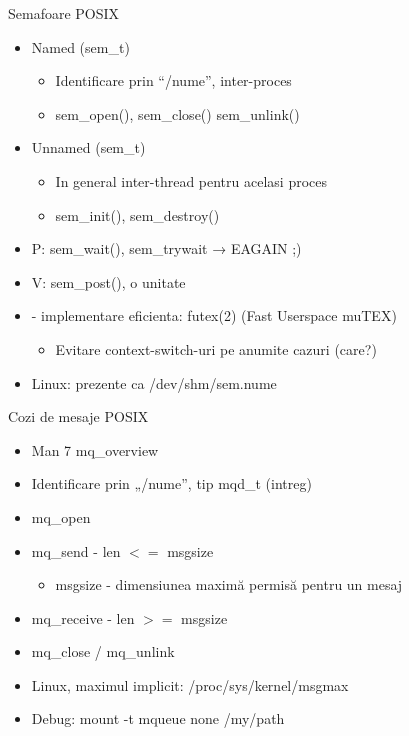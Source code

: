 \documentclass{so.cs.pub.ro}
\begin{document}
\begin{frame}{Semafoare POSIX}
  \begin{itemize}
		\item Named (sem_t)
  			\begin{itemize}
			 \item Identificare prin “/nume”, inter-proces
			 \item sem_open(), sem_close() sem_unlink()
		  \end{itemize}
		\item Unnamed (sem_t)
		  \begin{itemize}
			\item In general inter-thread pentru acelasi proces
			\item sem_init(), sem_destroy()
		  \end{itemize}
		\item P: sem_wait(), sem_trywait → EAGAIN ;)
		\item V: sem_post(), o unitate
		\item - implementare eficienta: futex(2) (Fast Userspace muTEX)
			\begin{itemize}
			 \item Evitare context-switch-uri pe anumite cazuri (care?)
			\end{itemize}
		\item Linux: prezente ca /dev/shm/sem.nume  
  \end{itemize}
\end{frame}

\begin{frame}{Cozi de mesaje POSIX}
  \begin{itemize}
		\item Man 7 mq_overview
		\item Identificare prin „/nume”, tip mqd_t (intreg)
		\vspace{0.3cm}		
		\item mq_open
		\vspace{0.3cm}
		\item mq_send - len $<=$ msgsize
		  \begin{itemize}
			\item msgsize  - dimensiunea maximă permisă pentru un mesaj
		  \end{itemize}
		\item mq_receive - len $>=$ msgsize
		\vspace{0.3cm}		
		\item mq_close / mq_unlink
		\vspace{0.3cm}		
		\item Linux, maximul implicit: /proc/sys/kernel/msgmax
		\item Debug: mount -t mqueue none /my/path
  \end{itemize}
\end{frame}
\end{document}
